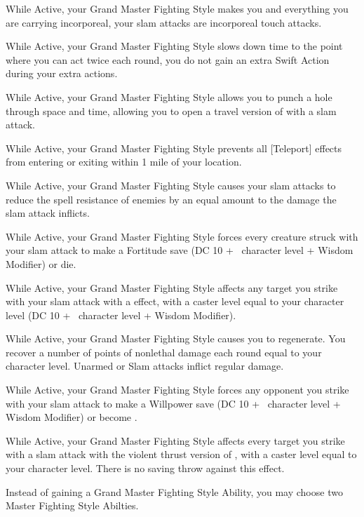 \begin{awesomelist}
    \item{While Active, your Grand Master Fighting Style makes you and everything you are carrying incorporeal, your slam attacks are incorporeal touch attacks.}
    \item{While Active, your Grand Master Fighting Style slows down time to the point where you can act twice each round, you do not gain an extra Swift Action during your extra actions.}
    \item{While Active, your Grand Master Fighting Style allows you to punch a hole through space and time, allowing you to open a travel version of  with a slam attack.}
    \item{While Active, your Grand Master Fighting Style prevents all [Teleport] effects from entering or exiting within 1 mile of your location.}
    \item{While Active, your Grand Master Fighting Style causes your slam attacks to reduce the spell resistance of enemies by an equal amount to the damage the slam attack inflicts.}
    \item{While Active, your Grand Master Fighting Style forces every creature struck with your slam attack to make a Fortitude save (DC 10 + \half\  character level + Wisdom Modifier) or die.}
    \item{While Active, your Grand Master Fighting Style affects any target you strike with your slam attack with a  effect, with a caster level equal to your character level (DC 10 + \half\  character level + Wisdom Modifier).}
    \item{While Active, your Grand Master Fighting Style causes you to regenerate. You recover a number of points of nonlethal damage each round equal to your character level. Unarmed or Slam attacks inflict regular damage.}
    \item{While Active, your Grand Master Fighting Style forces any opponent you strike with your slam attack to make a Willpower save (DC 10 + \half\  character level + Wisdom Modifier) or become .}
    \item{While Active, your Grand Master Fighting Style affects every target you strike with a slam attack with the violent thrust version of , with a caster level equal to your character level. There is no saving throw against this effect.}
    \item{Instead of gaining a Grand Master Fighting Style Ability, you may choose two Master Fighting Style Abilties.}
\end{awesomelist}

